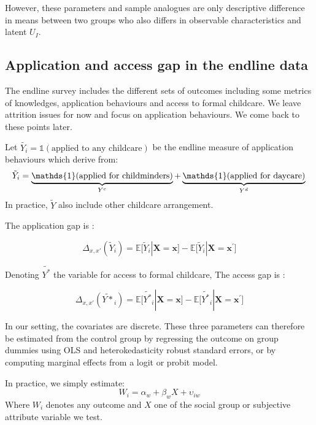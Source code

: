 \documentclass[
]{article}
\newcommand{\espb}[1]{\mathds{E}\Big[ #1 \Big]}
\newcommand{\one}[1]{\mathds{1}( #1 )}
\theoremstyle{definition}
\theoremstyle{definition}
\theoremstyle{definition}
\theoremstyle{definition}
\theoremstyle{remark}
\begin{document}
However, these parameters and sample analogues are only descriptive difference in means between two groups who also differs in observable characteristics and latent \(U_I\).

\subsection{Application and access gap in the endline data}\label{application-and-access-gap-in-the-endline-data}

The endline survey includes the different sets of outcomes including some metrics of knowledges, application behaviours and access to formal childcare. We leave attrition issues for now and focus on application behaviours. We come back to these points later.

Let \(\tilde{Y_i}=\one{\text{applied to any childcare}}\) be the endline measure of application behaviours which derive from:
\[
\tilde{Y}_{i}=\underbrace{\one{\text{applied for childminders}}}_{Y^c}+\underbrace{\one{\text{applied for daycare}}}_{Y^d}\\
\]
In practice, \(\tilde{Y}\) also include other childcare arrangement.

The application gap is :

\begin{equation}
\Delta_{x,x'}(\tilde{Y}_i) = \espb{\tilde{Y}_i|\mathbf{X}=\mathbf{x}}-\espb{\tilde{Y}_i|\mathbf{X}=\mathbf{x^\prime}}
\end{equation}

Denoting \(\tilde{Y^*}\) the variable for access to formal childcare, The access gap is :

\begin{equation}
\Delta_{x,x'}(\tilde{Y*}_i) = \espb{\tilde{Y^*}_i|\mathbf{X}=\mathbf{x}}-\espb{\tilde{Y^*}_i|\mathbf{X}=\mathbf{x^\prime}}
\end{equation}

In our setting, the covariates are discrete. These three parameters can therefore be estimated from the control group by regressing the outcome on group dummies using OLS and heterokedasticity robust standard errors, or by computing marginal effects from a logit or probit model.

In practice, we simply estimate:
\begin{equation}
W_i = \alpha_w +\beta_w X+ \upsilon_{iw}
\end{equation}
Where \(W_i\) denotes any outcome and \(X\) one of the social group or subjective attribute variable we test.
\end{document}
